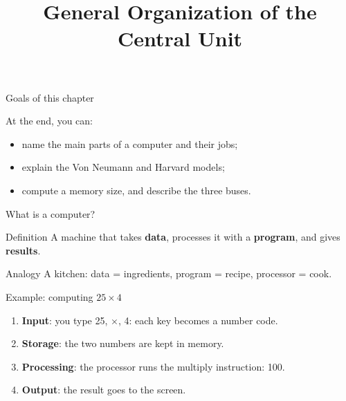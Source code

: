 \documentclass[aspectratio=169, 11pt, t, xcolor={table}]{beamer}
\title[Ch. 1: Organization of the central unit]{General Organization of the Central Unit}
\begin{document}

\begin{frame}{Goals of this chapter}
    \begin{tbox}{\faBullseye\quad At the end, you can:}
        \begin{itemize}
            \item name the main parts of a computer and their jobs;
            \item explain the Von Neumann and Harvard models;
            \item compute a memory size, and describe the three buses.
        \end{itemize}
    \end{tbox}
\end{frame}

\begin{frame}{What is a computer?}
    \begin{tbox}{\faLightbulb\quad Definition}
        A machine that takes \textbf{data}, processes it with a \textbf{program}, and gives \textbf{results}.
    \end{tbox}
    \begin{center}
    \end{center}
    \begin{pbox}{\faSmile\quad Analogy}
        A kitchen: data = ingredients, program = recipe, processor = cook.
    \end{pbox}
\end{frame}

\begin{frame}{Example: computing $25 \times 4$}
    \begin{enumerate}
        \item \textbf{Input}: you type 25, $\times$, 4: each key becomes a number code.
        \item \textbf{Storage}: the two numbers are kept in memory.
        \item \textbf{Processing}: the processor runs the multiply instruction: 100.
        \item \textbf{Output}: the result goes to the screen.
    \end{enumerate}
\end{frame}
\end{document}
